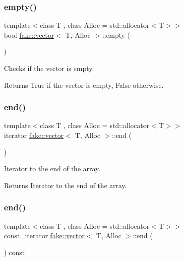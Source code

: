 \subsubsection{\texorpdfstring{empty()}{empty()}}
{\footnotesize\ttfamily template$<$class T , class Alloc  = std\+::allocator$<$\+T$>$$>$ \\
bool \mbox{\hyperlink{classfake_1_1vector}{fake\+::vector}}$<$ T, Alloc $>$\+::empty (\begin{DoxyParamCaption}{ }\end{DoxyParamCaption})\hspace{0.3cm}{\ttfamily [inline]}}



Checks if the vector is empty. 

\begin{DoxyReturn}{Returns}
True if the vector is empty, False otherwise. 
\end{DoxyReturn}
\mbox{\label{classfake_1_1vector_aa8b27b92fd87317d279876243372fdfe}} 
\subsubsection{\texorpdfstring{end()}{end()}\hspace{0.1cm}{\footnotesize\ttfamily [1/2]}}
{\footnotesize\ttfamily template$<$class T , class Alloc  = std\+::allocator$<$\+T$>$$>$ \\
iterator \mbox{\hyperlink{classfake_1_1vector}{fake\+::vector}}$<$ T, Alloc $>$\+::end (\begin{DoxyParamCaption}{ }\end{DoxyParamCaption})\hspace{0.3cm}{\ttfamily [inline]}}



Iterator to the end of the array. 

\begin{DoxyReturn}{Returns}
Iterator to the end of the array. 
\end{DoxyReturn}
\mbox{\label{classfake_1_1vector_a76f745c7d40fc82937f201dd22cd95d8}} 
\subsubsection{\texorpdfstring{end()}{end()}\hspace{0.1cm}{\footnotesize\ttfamily [2/2]}}
{\footnotesize\ttfamily template$<$class T , class Alloc  = std\+::allocator$<$\+T$>$$>$ \\
const\+\_\+iterator \mbox{\hyperlink{classfake_1_1vector}{fake\+::vector}}$<$ T, Alloc $>$\+::end (\begin{DoxyParamCaption}{ }\end{DoxyParamCaption}) const\hspace{0.3cm}{\ttfamily [inline]}}



